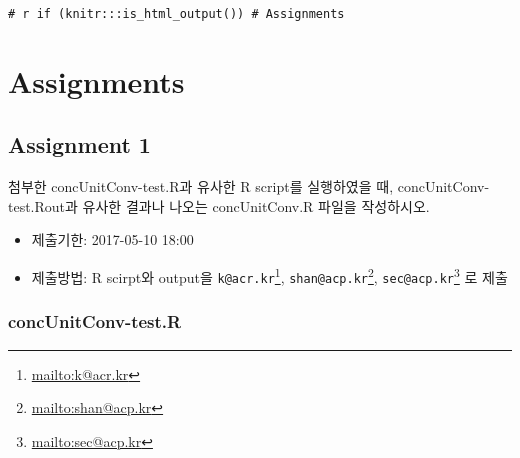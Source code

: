 \documentclass[10pt,]{krantz}
\providecommand{\tightlist}{%
  \setlength{\itemsep}{0pt}\setlength{\parskip}{0pt}}
\renewcommand{\href}[2]{#2\footnote{\url{#1}}}
\begin{document}
\cleardoublepage 

\appendix {}


\texttt{\#\ r\ if\ (knitr:::is\_html\_output())\ \textquotesingle{}\#\ Assignments\textquotesingle{}}

\chapter{Assignments}\label{assignments}

\section{Assignment 1}\label{assignment-1}

첨부한 concUnitConv-test.R과 유사한 R script를 실행하였을 때,
concUnitConv-test.Rout과 유사한 결과나 나오는 concUnitConv.R 파일을
작성하시오.

\begin{itemize}
\tightlist
\item
  제출기한: 2017-05-10 18:00
\item
  제출방법: R scirpt와 output을
  \href{mailto:k@acr.kr}{\nolinkurl{k@acr.kr}},
  \href{mailto:shan@acp.kr}{\nolinkurl{shan@acp.kr}},
  \href{mailto:sec@acp.kr}{\nolinkurl{sec@acp.kr}} 로 제출
\end{itemize}

\subsection{concUnitConv-test.R}\label{concunitconv-test.r}
\end{document}
